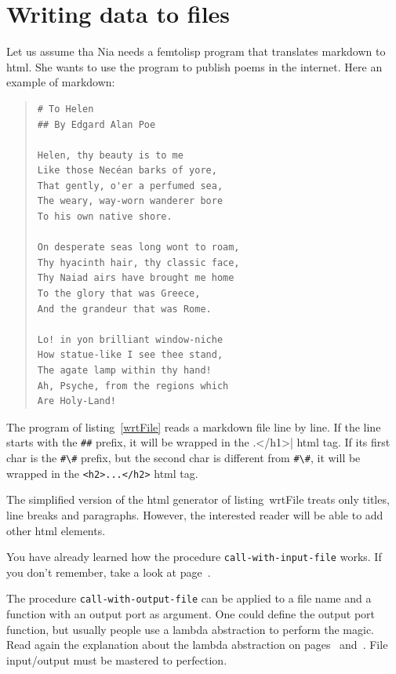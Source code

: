 \documentclass[a4paper,12pt]{book}
\begin{document}
\section{Writing data to files}
Let us assume tha Nia needs 
a femtolisp program that translates
markdown to html. She wants to
use the program to publish poems
in the internet. Here an example
of markdown:
\begin{quote}
\begin{verbatim}
# To Helen
## By Edgard Alan Poe

Helen, thy beauty is to me
Like those Necéan barks of yore,
That gently, o'er a perfumed sea,
The weary, way-worn wanderer bore
To his own native shore.

On desperate seas long wont to roam,
Thy hyacinth hair, thy classic face,
Thy Naiad airs have brought me home
To the glory that was Greece,
And the grandeur that was Rome.

Lo! in yon brilliant window-niche 
How statue-like I see thee stand, 
The agate lamp within thy hand! 
Ah, Psyche, from the regions which 
Are Holy-Land! 
\end{verbatim}
\end{quote}

The program of listing~\ref{wrtFile}
reads a markdown file line by line.
If the line starts with the \verb|##| prefix,
it will be wrapped in the \verb<h1>...</h1>|
html tag. If its first char is the \verb|#\#|
prefix, but the second char is different
from \verb|#\#|, it will be wrapped in
the \verb|<h2>...</h2>| html tag.

The simplified version of the html
generator of listing~{wrtFile} treats
only titles, line breaks and paragraphs.
However, the interested reader will
be able to add other html elements.

You have already learned how the
procedure \verb|call-with-input-file| works.
If you don't remember, take a look at
page~\pageref{page:call-with-input-file}.

The procedure
\verb|call-with-output-file|
can be
applied to a file name and a function
with an output port as argument. One could
define the output port function, but
usually people use a lambda abstraction
to perform the magic. Read again the
explanation about the lambda abstraction
on pages~\pageref{page:lambda1}
and~\pageref{page:lambda2}. File input/output
must be mastered to perfection.
\end{document}
